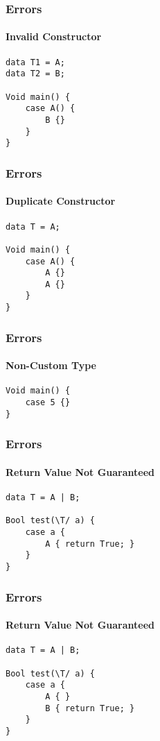 \documentclass[12pt]{beamer}
\begin{document}
\begin{frame}[fragile]
    \frametitle{Errors}
    \framesubtitle{Invalid Constructor}
    \begin{verbatim}
data T1 = A;
data T2 = B;

Void main() {
    case A() {
        B {}
    }
}\end{verbatim}
\end{frame}

\begin{frame}[fragile]
    \frametitle{Errors}
    \framesubtitle{Duplicate Constructor}
    \begin{verbatim}
data T = A;

Void main() {
    case A() {
        A {}
        A {}
    }
}\end{verbatim}
\end{frame}

\begin{frame}[fragile]
    \frametitle{Errors}
    \framesubtitle{Non-Custom Type}
    \begin{verbatim}
Void main() {
    case 5 {}
}\end{verbatim}
\end{frame}

\begin{frame}[fragile]
    \frametitle{Errors}
    \framesubtitle{Return Value Not Guaranteed}
    \begin{verbatim}
data T = A | B;

Bool test(\T/ a) {
    case a {
        A { return True; }
    }
}\end{verbatim}
\end{frame}

\begin{frame}[fragile]
    \frametitle{Errors}
    \framesubtitle{Return Value Not Guaranteed}
    \begin{verbatim}
data T = A | B;

Bool test(\T/ a) {
    case a {
        A { }
        B { return True; }
    }
}\end{verbatim}
\end{frame}
\end{document}
